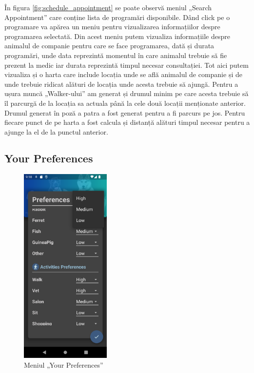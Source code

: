 În figura \ref{fig:schedule_appointment} se poate observă meniul „Search Appointment” care conține lista de programări disponibile. Dând click pe o programare va apărea un meniu pentru vizualizarea informațiilor despre programarea selectată. Din acest meniu putem vizualiza informațiile despre animalul de companie pentru care se face programarea, dată și durata programări, unde data reprezintă momentul în care animalul trebuie să fie prezent la medic iar durata reprezintă timpul necesar consultației. Tot aici putem vizualiza și o harta care include locația unde se află animalul de companie și de unde trebuie ridicat alături de locația unde acesta trebuie să ajungă. Pentru a ușura muncă „Walker-ului” am generat și drumul minim pe care acesta trebuie să îl parcurgă de la locația sa actuala până la cele două locații menționate anterior. Drumul generat în poză a patra a fost generat pentru a fi parcurs pe jos. Pentru fiecare punct de pe harta a fost calcula și distanță alături timpul necesar pentru a ajunge la el de la punctul anterior.

\subsection{Your Preferences}

\begin{figure}
    \centering
    \includegraphics[width=0.4\textwidth]{images/screenshots/preferences.png}
    \caption{Meniul \newline „Your Preferences”}
    \label{fig:your_preferences}
\end{figure}

